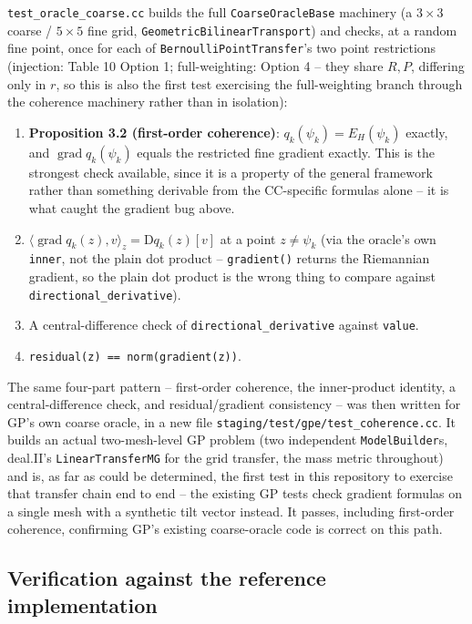 \documentclass[11pt]{article}
\begin{document}
\texttt{test\_oracle\_coarse.cc} builds the full \texttt{CoarseOracleBase} machinery (a
$3\times3$ coarse / $5\times5$ fine grid, \texttt{GeometricBilinearTransport}) and checks, at a
random fine point, once for each of \texttt{BernoulliPointTransfer}'s two point restrictions
(injection: Table 10 Option 1; full-weighting: Option 4 -- they share $R,P$, differing only in
$r$, so this is also the first test exercising the full-weighting branch through the coherence
machinery rather than in isolation):
\begin{enumerate}[nosep]
  \item \textbf{Proposition 3.2 (first-order coherence)}: $q_k(\psi_k)=E_H(\psi_k)$ exactly,
        and $\operatorname{grad}q_k(\psi_k)$ equals the restricted fine gradient exactly.
        This is the strongest check available, since it is a property of the general
        framework rather than something derivable from the CC-specific formulas alone --
        it is what caught the gradient bug above.
  \item $\langle\operatorname{grad}q_k(z),v\rangle_z=\mathrm Dq_k(z)[v]$ at a point
        $z\neq\psi_k$ (via the oracle's own \texttt{inner}, not the plain dot product --
        \texttt{gradient()} returns the Riemannian gradient, so the plain dot product is
        the wrong thing to compare against \texttt{directional\_derivative}).
  \item A central-difference check of \texttt{directional\_derivative} against \texttt{value}.
  \item \texttt{residual(z) == norm(gradient(z))}.
\end{enumerate}

The same four-part pattern -- first-order coherence, the inner-product identity, a
central-difference check, and residual/gradient consistency -- was then written for GP's
own coarse oracle, in a new file \texttt{staging/test/gpe/test\_coherence.cc}. It builds an actual
two-mesh-level GP problem (two independent \texttt{ModelBuilder}s, deal.II's
\texttt{LinearTransferMG} for the grid transfer, the mass metric throughout) and is, as far
as could be determined, the first test in this repository to exercise that transfer chain
end to end -- the existing GP tests check gradient formulas on a single mesh with a
synthetic tilt vector instead. It passes, including first-order coherence, confirming GP's
existing coarse-oracle code is correct on this path.

\subsection{Verification against the reference implementation}
\label{sec:verification}
\end{document}
